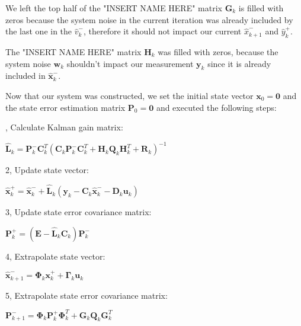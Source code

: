 \documentclass[class=article, crop=false]{standalone}
\begin{document}
We left the top half of the "INSERT NAME HERE" matrix $\textbf{G}_k$ is filled with zeros because the system noise in the current iteration was already included by the last one in the $\hat{v}_{k}^-$, therefore it should not impact our current $\hat{x}_{k+1}^-$ and $\hat{y}_{k}^+$.

The "INSERT NAME HERE" matrix $\textbf{H}_k$ was filled with zeros, because the system noise $\textbf{w}_k$ shouldn't impact our measurement $\textbf{y}_k$ since it is already included in $\hat{\textbf{x}}_{k}^-$.

Now that our system was constructed, we set the initial state vector $\textbf{x}_0 = \textbf{0}$ and the state error estimation matrix $\textbf{P}_0 = \textbf{0}$ and executed the following steps:

, Calculate Kalman gain matrix:
\vspace{0.5cm}
\begin{center}
$ \hat{\textbf{L}}_k = \textbf{P}^-_k \textbf{C}^T_k (\textbf{C}_k \textbf{P}^-_k \textbf{C}^T_k + \textbf{H}_k \textbf{Q}_k \textbf{H}^T_k + \textbf{R}_k)^{-1} $
\end{center}
\vspace{0.5cm}
2, Update state vector:
\vspace{0.5cm}
\begin{center}
$ \hat{\textbf{x}}^+_k = \hat{\textbf{x}}^-_k + \hat{\textbf{L}}_k (\textbf{y}_k - \textbf{C}_k \hat{\textbf{x}}^-_k - \textbf{D}_k \textbf{u}_k) $
\end{center}
\vspace{0.5cm}
3, Update state error covariance matrix:
\vspace{0.5cm}
\begin{center}
$ \textbf{P}^+_k = (\textbf{E} - \hat{\textbf{L}}_k \textbf{C}_k ) \textbf{P}^-_k $
\end{center}
\vspace{0.5cm}
4, Extrapolate state vector:
\vspace{0.5cm}
\begin{center}
$ \hat{\textbf{x}}^-_{k+1} = \boldsymbol{\Phi}_k \textbf{x}^+_k + \boldsymbol{\Gamma}_k \textbf{u}_k $
\end{center}
\vspace{0.5cm}
5, Extrapolate state error covariance matrix:
\vspace{0.5cm}
\begin{center}
$ \textbf{P}^-_{k+1} = \boldsymbol{\Phi}_k \textbf{P}^+_k \boldsymbol{\Phi}^T_k + \textbf{G}_k \textbf{Q}_k \textbf{G}^T_k $
\end{center}
\end{document}
